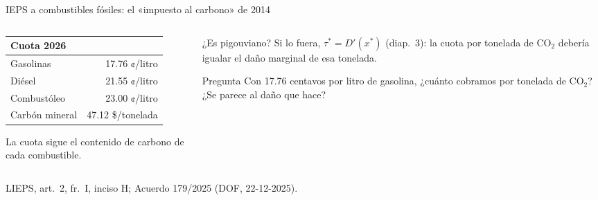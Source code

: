 \documentclass[aspectratio=169,11pt]{beamer}
\newcommand{\fuente}[1]{\par\vfill{\small\color{cGris}#1\par}}
\begin{document}
\begin{frame}{IEPS a combustibles fósiles: el «impuesto al carbono» de 2014}
  \begin{columns}[T]
    \begin{column}{0.46\textwidth}
      \centering
      \begin{tabular}{lr}
        \toprule
        Cuota 2026 & \\
        \midrule
        Gasolinas & 17.76 ¢/litro\\
        Diésel & 21.55 ¢/litro\\
        Combustóleo & 23.00 ¢/litro\\
        Carbón mineral & 47.12 \$/tonelada\\
        \bottomrule
      \end{tabular}
      \par\smallskip
      \raggedright
      {\small La cuota sigue el contenido de carbono de cada combustible.}
    \end{column}
    \begin{column}{0.5\textwidth}
      \pause
      \begin{block}{¿Es pigouviano?}
        Si lo fuera, $\tau^* = D'(x^*)$ (diap.~3): la cuota por tonelada de CO$_2$ debería igualar el daño marginal de esa tonelada.
      \end{block}
      \pause
      \begin{alertblock}{Pregunta}
        Con 17.76 centavos por litro de gasolina, ¿cuánto cobramos por tonelada de CO$_2$? ¿Se parece al daño que hace?
      \end{alertblock}
    \end{column}
  \end{columns}
  \fuente{LIEPS, art.~2, fr.~I, inciso H; Acuerdo 179/2025 (DOF, 22-12-2025).}
\end{frame}
\end{document}

